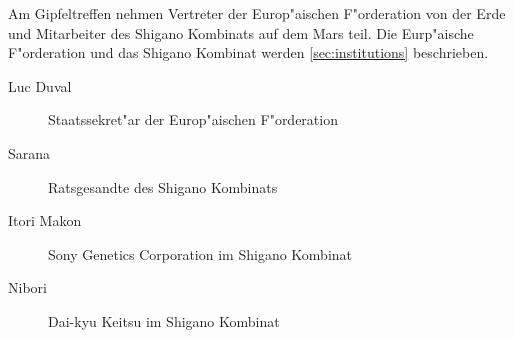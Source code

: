 
Am Gipfeltreffen nehmen Vertreter der Europ"aischen F"orderation von der Erde und Mitarbeiter des Shigano Kombinats auf dem
Mars teil. Die Eurp"aische F"orderation und das Shigano Kombinat werden \cref{sec:institutions} beschrieben.

\begin{description}
    \item [Luc Duval] Staatssekret"ar der Europ"aischen F"orderation
    \item [Sarana] Ratsgesandte des Shigano Kombinats
    \item [Itori Makon] Sony Genetics Corporation im Shigano Kombinat
    \item [Nibori] Dai-kyu Keitsu im Shigano Kombinat
\end{description}

